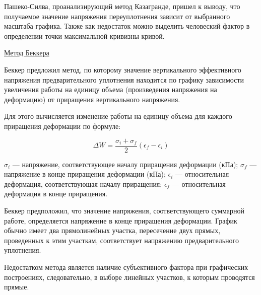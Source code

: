 Пашеко-Силва, проанализирующий метод Казагранде, пришел к выводу, 
что получаемое значение напряжения переуплотнения зависит от выбранного
масштаба графика. Также как недостаток можно выделить человеский 
фактор в определении точки максимальной кривизны кривой.


\underline{Метод Беккера}

Беккер предложил метод, по которому значение вертикального эффективного 
напряжения предварительного уплотнения находится по 
графику зависимости увеличения работы на единицу объема 
(произведения напряжения на деформацию) от приращения вертикального напряжения.

Для этого вычисляется изменение работы на единицу объема для каждого
приращения деформации по формуле:

\[
   \Delta W = \frac{\sigma_i + \sigma_f}{2}(\epsilon_f - \epsilon_i)
\]

$\sigma_i$ --- напряжение, соответствующее началу приращения деформации (кПа); 
$\sigma_f$ --- напряжение в конце приращения деформации (кПа);
$\epsilon_i$ --- относительная деформация, соответствующая началу приращения; 
$\epsilon_f$ --- относительная деформация в конце
приращения.

Беккер предположил, что значение напряжения, соответствующего суммарной 
работе, определяется напряжение в конце приращения деформации.
График обычно имеет два прямолинейных участка, пересечение 
двух прямых, проведенных к этим участкам, соответствует 
напряжению предварительного уплотнения. 

Недостатком метода является наличие субъективного фактора при
графических построениях, следовательно, в выборе линейных участков, 
к которым проводятся прямые.